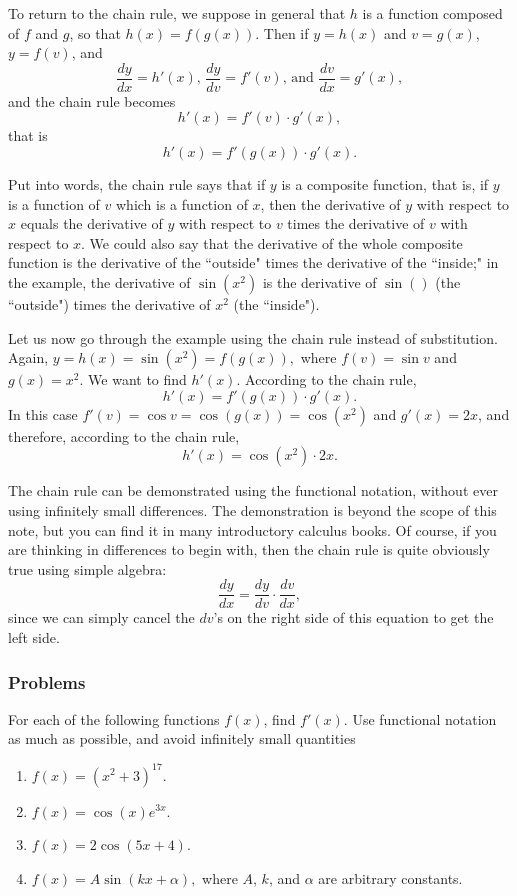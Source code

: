\documentclass[twoside,openright]{article}
\begin{document}
To return to the chain rule, we suppose in general that $h$ is a function composed of $f$ and $g$, so that $h(x) = f(g(x))$.  Then if $y= h(x)$ and $v= g(x)$, $y = f(v)$, and 
$$\frac{dy}{dx} = h'(x)\mbox{, } \frac{dy}{dv} = f'(v)\mbox{, and } \frac{dv}{dx} = g'(x),$$
and the chain rule becomes
$$h'(x) = f'(v)\cdot g'(x),$$
that is
$$h'(x) = f'(g(x))\cdot g'(x).$$

Put into words, the chain rule says that if $y$ is a composite
function, that is, if $y$ is a function of $v$ which is a function of
$x$, then the derivative of $y$ with respect to $x$ equals the
derivative of $y$ with respect to $v$ times the derivative of $v$ with
respect to $x$.  We could also say that the derivative of the whole
composite function is the derivative of the ``outside" times the
derivative of the ``inside;" in the example, the derivative of
$\sin(x^2)$ is the derivative of $\sin()$ (the ``outside") times the
derivative of $x^2$ (the ``inside").

Let us now go through the example using the chain rule instead of
substitution. Again, $y = h(x) = \sin (x^2) = f(g(x)),$ where $f(v) = \sin v$ and $g(x) = x^2$. We want to find $h'(x).$   According to the chain rule,
$$h'(x) = f'(g(x))\cdot g'(x).$$
In this case $f'(v) = \cos v = \cos (g(x)) = \cos (x^2)$ and $g'(x) = 2x$, and 
therefore, according to the chain rule,
$$h'(x) = \cos (x^2) \cdot 2x.$$

The chain rule can be demonstrated using the functional notation,
without ever using infinitely small differences.  The demonstration is
beyond the scope of this note, but you can find it in many introductory
calculus books.  Of course, if you are thinking in differences to
begin with, then the chain rule is quite obviously true using simple
algebra:
$$\frac{dy}{dx} = \frac{dy}{dv}\cdot \frac{dv}{dx},$$
since we can simply cancel the $dv$'s on the right side of this
equation to get the left side.

\subsubsection*{Problems}
For each of the following functions $f(x)$, find $f'(x)$.  Use
functional notation as much as possible, and avoid infinitely small
quantities
\begin{enumerate}
\itemsep0em
  \setcounter{enumi}{1}
\item $f(x) = (x^2 + 3)^{17}.$
\item $f(x) = \cos(x)e^{3x}.$
\item $f(x) = 2\cos(5x + 4).$
\item $f(x) = A\sin(kx + \alpha),$ where $A$, $k$, and $\alpha$ are
  arbitrary constants.
\end{enumerate}\label{chainruleend}
\end{document}
